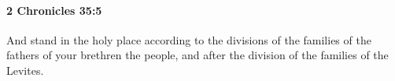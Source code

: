 
		\paragraph{2 Chronicles 35:5} %
			\label{2CHRONICLES-35-5}

			And stand in the holy place according to the divisions of the families of the fathers of your brethren the people, and after the division of the families of the Levites.



